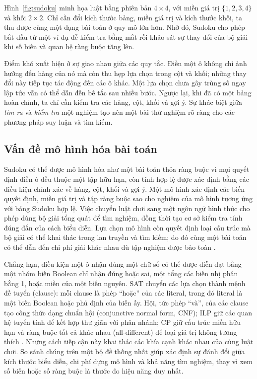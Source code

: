\documentclass[a4paper]{cas-sc}
\begin{document}
Hình~\ref{fig:sudoku} minh họa luật bằng phiên bản $4\times4$, với miền giá trị $\{1,2,3,4\}$ và khối $2\times2$. Chỉ cần đổi kích thước bảng, miền giá trị và kích thước khối, ta thu được cùng một dạng bài toán ở quy mô lớn hơn. Nhờ đó, Sudoku cho phép bắt đầu từ một ví dụ dễ kiểm tra bằng mắt rồi khảo sát sự thay đổi của bộ giải khi số biến và quan hệ ràng buộc tăng lên.
\begin{reportfigure}
\centering
\caption{Một đề Sudoku $4\times4$ và một nghiệm hợp lệ. Số đen là gợi ý, số xanh là giá trị điền thêm; dải ngang, dải dọc và khung xanh lá minh họa hàng, cột và khối.}
\label{fig:sudoku}
\end{reportfigure}

Điểm khó xuất hiện ở sự giao nhau giữa các quy tắc. Điền một ô không chỉ ảnh hưởng đến hàng của nó mà còn thu hẹp lựa chọn trong cột và khối; những thay đổi này tiếp tục tác động đến các ô khác. Một lựa chọn chưa gây trùng số ngay lập tức vẫn có thể dẫn đến bế tắc sau nhiều bước. Ngược lại, khi đã có một bảng hoàn chỉnh, ta chỉ cần kiểm tra các hàng, cột, khối và gợi ý. Sự khác biệt giữa \emph{tìm ra} và \emph{kiểm tra} một nghiệm tạo nên một bài thử nghiệm rõ ràng cho các phương pháp suy luận và tìm kiếm.

\subsection{Vấn đề mô hình hóa bài toán}
Sudoku có thể được mô hình hóa như một bài toán thỏa ràng buộc vì mọi quyết định điền ô đều thuộc một tập hữu hạn, còn tính hợp lệ được xác định bằng các điều kiện chính xác về hàng, cột, khối và gợi ý. Một mô hình xác định các biến quyết định, miền giá trị và tập ràng buộc sao cho nghiệm của mô hình tương ứng với bảng Sudoku hợp lệ. Việc chuyển luật chơi sang một ngôn ngữ hình thức cho phép dùng bộ giải tổng quát để tìm nghiệm, đồng thời tạo cơ sở kiểm tra tính đúng đắn của cách biểu diễn. Lựa chọn mô hình còn quyết định loại cấu trúc mà bộ giải có thể khai thác trong lan truyền và tìm kiếm; do đó cùng một bài toán có thể dẫn đến chi phí giải khác nhau dù tập nghiệm được bảo toàn \citep{lynce2006,regin1994}.

Chẳng hạn, điều kiện một ô nhận đúng một chữ số có thể được diễn đạt bằng một nhóm biến Boolean chỉ nhận đúng hoặc sai, một tổng các biến nhị phân bằng 1, hoặc miền của một biến nguyên. SAT chuyển các lựa chọn thành mệnh đề tuyển (clause): mỗi clause là phép ``hoặc'' của các literal, trong đó literal là một biến Boolean hoặc phủ định của biến ấy. Hội, tức phép ``và'', của các clause tạo công thức dạng chuẩn hội (conjunctive normal form, CNF); ILP giữ các quan hệ tuyến tính để kết hợp thư giãn với phân nhánh; CP giữ cấu trúc miền hữu hạn và ràng buộc tất cả khác nhau (all-different) để loại giá trị không tương thích \citep{lynce2006,gurobiSudoku,ibmCPManual}. Những cách tiếp cận này khai thác các khía cạnh khác nhau của cùng luật chơi. So sánh chúng trên một bộ đề thống nhất giúp xác định sự đánh đổi giữa kích thước biểu diễn, chi phí dựng mô hình và khả năng tìm nghiệm, thay vì xem số biến hoặc số ràng buộc là thước đo hiệu năng duy nhất.
\end{document}
